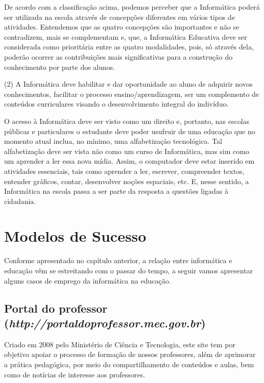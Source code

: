 \documentclass[a4paper,12pt]{report}
\begin{document}
    De acordo com a classificação acima, podemos perceber que a Informática
    poderá ser utilizada na escola através de concepções diferentes em vários
    tipos de atividades. Entendemos que as quatro concepções são importantes e
    não se contradizem, mais se complementam e, que, a Informática Educativa
    deve ser considerada como prioritária entre as quatro modalidades, pois, só
    através dela, poderão ocorrer as contribuições mais significativas para a
    construção do conhecimento por parte dos alunos.

    (2) A Informática deve habilitar e dar oportunidade ao aluno de adquirir
    novos conhecimentos, facilitar o processo ensino/aprendizagem, ser um
    complemento de conteúdos curriculares visando o desenvolvimento integral do
    indivíduo.

    O acesso à Informática deve ser visto como um direito e, portanto, nas
    escolas públicas e particulares o estudante deve poder usufruir de uma
    educação que no momento atual inclua, no mínimo, uma alfabetização
    tecnológica. Tal alfabetização deve ser vista não como um curso de
    Informática, mas sim como um aprender a ler essa nova mídia. Assim, o
    computador deve estar inserido em atividades essenciais, tais como aprender
    a ler, escrever, compreender textos, entender gráficos, contar, desenvolver
    noções espaciais, etc. E, nesse sentido, a Informática na escola passa a ser
    parte da resposta a questões ligadas à cidadania.

    \chapter{Modelos de Sucesso}
    \label{ch:modelo_sucesso}
    Conforme apresentado no capítulo anterior, a relação entre informática e
    educação vêm se estreitando com o passar do tempo, a seguir vamos apresentar
    alguns casos de emprego da informática na educação.

        \section{Portal do professor
                \\(\emph{http://portaldoprofessor.mec.gov.br})}
        Criado em 2008 pelo Ministério de Ciência e Tecnologia, este site tem
        por objetivo apoiar o processo de formação de nossos professores, além
        de aprimorar a prática pedagógica, por meio do compartilhamento de
        conteúdos e aulas, bem como de notícias de interesse aos professores.
\end{document}
